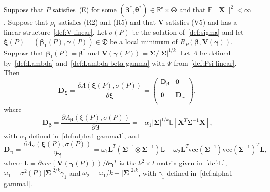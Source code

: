 \documentclass[10pt,a4paper]{amsart}
\newcommand{\E}{\mathbb{E}}
\newcommand{\R}{\mathbb{R}}
\newcommand{\bD}{\mathbf{D}}
\newcommand{\bL}{\mathbf{L}}
\newcommand{\bSigma}{\mathbf{\Sigma}}
\newcommand{\bTheta}{\bm\Theta}
\newcommand{\bV}{\mathbf{V}}
\newcommand{\bX}{\mathbf{X}}
\newcommand{\bbeta}{\bm\beta}
\newcommand{\bgamma}{\bm\gamma}
\newcommand{\btheta}{\bm\theta}
\newcommand{\bxi}{\bm\xi}
\newcommand{\vc}{\mathrm{vec}}
\begin{document}
\begin{lemma}
\label{lem:Lambda derivative}
Suppose that $P$ satisfies~(E) for some $(\bbeta^*,\btheta^*)\in\R^q\times\bTheta$
and that $\E\|\bX\|^2<\infty$.
Suppose that $\rho_1$ satisfies (R2) and (R5) and that $\bV$ satisfies (V5) and has
a linear structure~\eqref{def:V linear}.
Let $\sigma(P)$ be the solution of~\eqref{def:sigma} and let $\bxi(P)=(\bbeta_1(P),\bgamma(P))\in \mathfrak{D}$ be
a local minimum of $R_P(\bbeta,\bV(\bgamma))$.
Suppose that $\bbeta_1(P)=\bbeta^*$ and $\bV(\bgamma(P))=\bSigma/|\bSigma|^{1/k}$.
Let $\Lambda$ be defined by~\eqref{def:Lambda} and~\eqref{def:Lambda-beta-gamma} with $\Psi$ 
from~\eqref{def:Psi linear}.
Then 
\[
\bD_{\bxi}
=
\frac{\partial \Lambda(\bxi(P),\sigma(P))}{\partial \bxi}
=
\left(
  \begin{array}{cc}
\bD_{\bbeta} & \mathbf{0}\\
    \\
\mathbf{0} & \bD_{\bgamma} \\
  \end{array}
\right),
\]
where
\begin{equation}
\label{def:derivative Lambda beta}
\bD_{\bbeta}=
\frac{\partial\Lambda_{\bbeta}(\bxi(P),\sigma(P))}{\partial \bbeta}
=
-\alpha_1
|\bSigma|^{1/k}
\E\left[
\bX^T\bSigma^{-1}\bX
\right],
\end{equation}
with $\alpha_1$ defined in~\eqref{def:alpha1-gamma1}, 
and
\begin{equation}
\label{def:derivative Lambda gamma}
\bD_{\bgamma}=
\frac{\partial\Lambda_{\bgamma}(\bxi(P),\sigma(P))}{\partial \bgamma}
=
\omega_1\bL^T\left(\bSigma^{-1}\otimes\bSigma^{-1}\right)\bL
-
\omega_2\bL^T
\vc(\bSigma^{-1})
\vc(\bSigma^{-1})^T
\bL,
\end{equation}
where $\bL=\partial\vc(\bV(\bgamma(P)))/\partial\bgamma^T$ is the $k^2\times l$ matrix given in~\eqref{def:L},
$\omega_1=\sigma^2(P)|\bSigma|^{2/k}\gamma_1$ and $\omega_2=\omega_1/k+|\bSigma|^{2/k}$, 
with $\gamma_1$ defined in~\eqref{def:alpha1-gamma1}.
\end{lemma}
\end{document}
